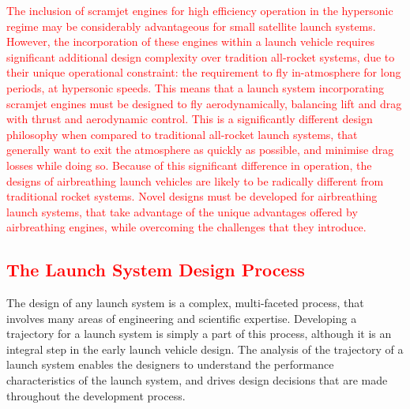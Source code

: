     \textcolor{red}{The inclusion of scramjet engines for high efficiency operation in the hypersonic regime may be considerably advantageous for small satellite launch systems. However, the incorporation of these engines within a launch vehicle requires significant additional design complexity over tradition all-rocket systems, due to their unique operational constraint: the requirement to fly in-atmosphere for long periods, at hypersonic speeds. This means that a launch system incorporating scramjet engines must be designed to fly aerodynamically, balancing lift and drag with thrust and aerodynamic control. 
    This is a significantly different design philosophy when compared to traditional all-rocket launch systems, that generally want to exit the atmosphere as quickly as possible, and minimise drag losses while doing so. Because of this significant difference in operation, the designs of airbreathing launch vehicles are likely to be radically different from traditional rocket systems. Novel designs must be developed for airbreathing launch systems, that take advantage of the unique advantages offered by airbreathing engines, while overcoming the challenges that they introduce. 
    	}
    
    
    
    
    
    \textcolor{red}{
    	\section{The Launch System Design Process}
    }
    
    The design of any launch system is a complex, multi-faceted process, that involves many areas of engineering and scientific expertise. Developing a trajectory for a launch system is simply a part of this process, although it is an integral step in the early launch vehicle design. The analysis of the trajectory of a launch system enables the designers to understand the performance characteristics of the launch system, and drives design decisions that are made throughout the development process. 
    
